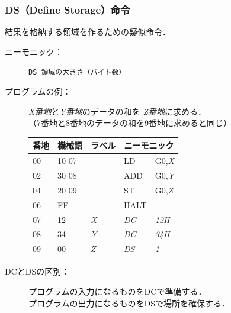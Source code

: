 \documentclass{beamer}                 %
\begin{document}
\begin{frame}
  \frametitle{DS（Define Storage）命令}
  結果を格納する領域を作るための疑似命令．
  \begin{description}
  \item[ニーモニック：] \texttt{DS 領域の大きさ（バイト数）}
  \vfill

  \item[プログラムの例：]\emph{X番地}と\emph{Y番地}のデータの和を
    \emph{Z番地}に求める．\\
    （7番地と8番地のデータの和を9番地に求めると同じ）\\
    {\ttfamily\small\begin{center}
      \begin{tabular}{|l|l|l|l l|} \hline
        番地 & 機械語 & ラベル & \multicolumn{2}{|c|}{ニーモニック} \\
        \hline
        00 & 10 07 &          & LD        & G0,\emph{X}  \\
        02 & 30 08 &          & ADD       & G0,\emph{Y}  \\
        04 & 20 09 &          & ST        & G0,\emph{Z}  \\
        06 & FF    &          & HALT      &              \\
        07 & 12    & \emph{X} & \emph{DC} & \emph{12H}   \\
        08 & 34    & \emph{Y} & \emph{DC} & \emph{34H}   \\
        09 & 00    & \emph{Z} & \emph{DS} & \emph{1}     \\
        \hline
      \end{tabular}
    \end{center}}
    \vfill

    \item[DCとDSの区別：]プログラムの入力になるものをDCで準備する．\\
      プログラムの出力になるものをDSで場所を確保する．
  \end{description}
\end{frame}
\end{document}
